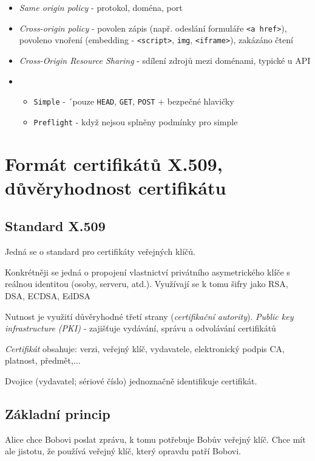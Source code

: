 \documentclass[10pt,a4paper]{article}
\begin{document}
\begin{itemize}\setlength\itemsep{0em}
    \item \textit{Same origin policy} - protokol, doména, port
    \item \textit{Cross-origin policy} - povolen zápis (např. odeslání formuláře \texttt{<a href>}), 
    povoleno vnoření (embedding - \texttt{<script>}, \texttt{img}, \texttt{<iframe>}), zakázáno čtení
    \item \textit{Cross-Origin Resource Sharing} - sdílení zdrojů mezi doménami, typické u API
    \item \begin{itemize}
        \item \texttt{Simple} - ´pouze \texttt{HEAD}, \texttt{GET}, \texttt{POST} + bezpečné hlavičky
        \item  \texttt{Preflight} - když nejsou splněny podmínky pro simple
    \end{itemize}
\end{itemize}


\section{Formát certifikátů X.509, důvěryhodnost certifikátu}

\subsection{Standard X.509}
Jedná se o standard pro certifikáty veřejných klíčů.

Konkrétněji se jedná o propojení vlastnictví privátního asymetrického klíče s reálnou identitou (osoby, serveru, atd.).
Využívají se k tomu šifry jako RSA, DSA, ECDSA, EdDSA

Nutnost je využití důvěryhodné třetí strany (\textit{certifikační autority}).
\textit{Public key infrastructure (PKI)} - zajišťuje vydávání, správu a odvolávání certifikátů

\textit{Certifikát} obsahuje: verzi, veřejný klíč, vydavatele, elektronický podpis CA, platnost, předmět,...

Dvojice (vydavatel; sériové číslo) jednoznačně identifikuje certifikát.

\subsection{Základní princip}
Alice chce Bobovi poslat zprávu, k tomu potřebuje Bobův veřejný klíč.
Chce mít ale jistotu, že používá veřejný klíč, který opravdu patří Bobovi.
\end{document}
